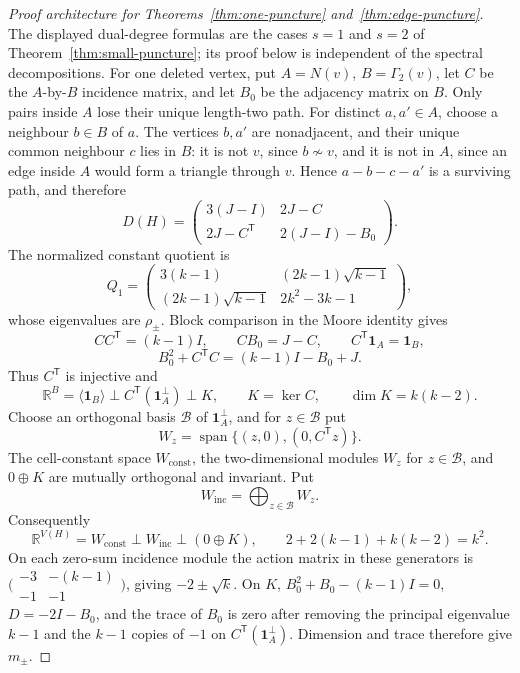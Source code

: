 \documentclass[a4paper,10pt,reqno]{amsart}
\theoremstyle{plain}
\theoremstyle{definition}
\theoremstyle{remark}
\newcommand{\one}{\mathbf 1}
\begin{document}
\begin{proof}[Proof architecture for Theorems~\ref{thm:one-puncture}
and~\ref{thm:edge-puncture}]
The displayed dual-degree formulas are the cases \(s=1\) and \(s=2\) of
Theorem~\ref{thm:small-puncture}; its proof below is independent of the
spectral decompositions.  For one deleted vertex, put \(A=N(v)\),
\(B=\Gamma_2(v)\), let \(C\) be
the \(A\)-by-\(B\) incidence matrix, and let \(B_0\) be the adjacency
matrix on \(B\).  Only pairs inside \(A\) lose their unique length-two path.
For distinct \(a,a'\in A\), choose a neighbour \(b\in B\) of \(a\).  The
vertices \(b,a'\) are nonadjacent, and their unique common neighbour \(c\)
lies in \(B\): it is not \(v\), since \(b\not\sim v\), and it is not in
\(A\), since an edge inside \(A\) would form a triangle through \(v\).
Hence \(a-b-c-a'\) is a surviving path, and therefore
\[
 D(H)=\begin{pmatrix}3(J-I)&2J-C\\2J-C^{\mathsf T}&2(J-I)-B_0\end{pmatrix}.
\]
The normalized constant quotient is
\[
 Q_1=\begin{pmatrix}
 3(k-1)&(2k-1)\sqrt{k-1}\\
 (2k-1)\sqrt{k-1}&2k^2-3k-1
 \end{pmatrix},
\]
whose eigenvalues are \(\rho_\pm\).  Block comparison in the Moore identity
gives
\[
 CC^{\mathsf T}=(k-1)I,\qquad
 CB_0=J-C,\qquad
 C^{\mathsf T}\one_A=\one_B,
\]
\[
 B_0^2+C^{\mathsf T}C=(k-1)I-B_0+J.
\]
Thus \(C^{\mathsf T}\) is injective and
\[
 \mathbb R^B=
 \langle\one_B\rangle\perp
 C^{\mathsf T}(\one_A^\perp)\perp K,
 \qquad K=\ker C,\qquad \dim K=k(k-2).
\]
Choose an orthogonal basis \(\mathcal B\) of \(\one_A^\perp\), and for
\(z\in\mathcal B\) put
\[
 W_z=\operatorname{span}\{(z,0),(0,C^{\mathsf T}z)\}.
\]
The cell-constant space \(W_{\mathrm{const}}\), the two-dimensional modules
\(W_z\) for \(z\in\mathcal B\), and \(0\oplus K\) are mutually orthogonal
and invariant.  Put
\[
 W_{\mathrm{inc}}=\bigoplus_{z\in\mathcal B}W_z.
\]
Consequently
\[
\mathbb R^{V(H)}=W_{\mathrm{const}}\perp W_{\mathrm{inc}}\perp(0\oplus K),
 \qquad 2+2(k-1)+k(k-2)=k^2.
\]
On each zero-sum incidence module the action matrix in these generators is
\(\bigl(\begin{smallmatrix}-3&-(k-1)\\-1&-1\end{smallmatrix}\bigr)\),
giving \(-2\pm\sqrt{k}\).  On \(K\),
\(B_0^2+B_0-(k-1)I=0\), \(D=-2I-B_0\), and the trace of \(B_0\) is
zero after removing the principal eigenvalue \(k-1\) and the \(k-1\)
copies of \(-1\) on \(C^{\mathsf T}(\one_A^\perp)\).  Dimension and trace
therefore give \(m_\pm\).


\end{proof}
\end{document}
